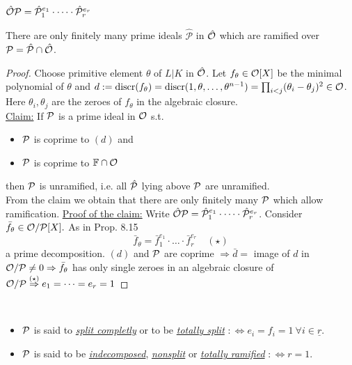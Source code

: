 
\hspace*{4cm}$\hat {\mathcal{O}} \mathcal{P}  = \hat{\mathcal P}_1^{e_1} \cdot \dots \cdot \hat{\mathcal P}_r^{e_r}$ \quad \quad 
{}

\begin{Prop}
There are only finitely many prime ideals $\hat{\mathcal P}$ in $\hat {\mathcal{O}}$ which are ramified over $\mathcal{P}= \hat{\mathcal P} \cap \hat {\mathcal{O}}$.
\end{Prop}

\begin{proof}
Choose primitive element $\theta$ of $L | K$ in $\hat{\mathcal{O}}$. Let $f_\theta \in \mathcal{O}[X]$ be the minimal polynomial of $\theta$ and $d:=\operatorname{discr}(f_\theta)=\operatorname{discr}(1, \theta, \ldots, \theta^{n-1})=\prod_{i <j}(\theta_i-\theta_j)^2 \in \mathcal{O}$.\\
Here $\theta_i, \theta_j$ are the zeroes of $f_\theta$ in the algebraic closure.\\
\underline{Claim:} If $\mathcal{P}$ is a prime ideal in $\mathcal{O}$ s.t.
\begin{itemize}
\item $\mathcal{P}$ is coprime to $(d)$ and
\item $\mathcal{P}$ is coprime to $\mathbb{F} \cap \mathcal{O}$
\end{itemize}
then $\mathcal{P}$ is unramified, i.e. all $\hat{\mathcal{P}}$ lying above $\mathcal{P}$ are unramified.\\
From the claim we obtain that there are only finitely many $\mathcal{P}$ which allow ramification.
\underline{Proof of the claim:} Write $\hat{\mathcal{O}}\mathcal{P}=\hat{\mathcal{P}}_1^{e_1}\cdot \dots \cdot \hat{\mathcal{P}}_r^{e_r}$. Consider $\bar{f}_\theta\in \mathcal{O}/\mathcal{P}[X].$ As in Prop. 8.15
\[\bar{f}_\theta = \bar{f}_1^{e_1} \cdot \ldots \cdot \bar{f}_r^{e_r} \quad  (\star)\]
a prime decomposition. $(d)$ and $\mathcal{P}$ are coprime $\Rightarrow \bar{d}=$ image of $d$ in $\mathcal{O}/\mathcal{P} \neq 0 \Rightarrow \bar{f}_\theta$ has only single zeroes in an algebraic closure of $\mathcal{O}/\mathcal{P} \stackrel{(\star)}{\Rightarrow} e_1=\dots=e_r=1$
\end{proof}

\begin{defi}\ \vspace*{-\baselineskip} \\
\begin{itemize}
\item $\mathcal{P}$ is said to \emph{\underline{split completly}} or to be \emph{\underline{totally split}} $:\iff e_i=f_i=1 \ \forall i \in \underline{r}$.
\item $\mathcal{P}$ is said to be \emph{\underline{indecomposed}}, \emph{\underline{nonsplit}} or \emph{\underline{totally ramified}} $:\iff r=1$.
\end{itemize}
\end{defi}

